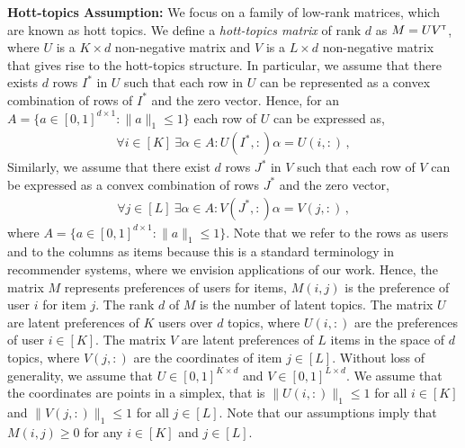 \textbf{Hott-topics Assumption:} We focus on a family of low-rank matrices, which are known as hott topics. We define a \emph{hott-topics matrix} of rank $d$ as $M = U V^\mathsf{\scriptscriptstyle T}$, where $U$ is a $K \times d$ non-negative matrix and $V$ is a $L \times d$ non-negative matrix that gives rise to the hott-topics structure. In particular, we assume that there exists $d$ rows $I^\ast$ in $U$ such that each row in $U$ can be represented as a convex combination of rows of $I^\ast$ and the zero vector. Hence, for an $A = \{a \in [0, 1]^{d \times 1}: \|a\|_1 \leq 1\}$ each row of $U$ can be expressed as,
\begin{align}
  \forall i \in [K] \ \exists \alpha \in A: U(I^\ast, :) \alpha = U(i, :)\,,
  \label{eq:hott topics1}
\end{align}
Similarly, we assume that there exist $d$ rows $J^\ast$ in $V$ such that each row of $V$ can be expressed as a convex combination of rows $J^\ast$ and the zero vector,
\begin{align}
  \forall j \in [L] \ \exists \alpha \in A: V(J^\ast, :) \alpha = V(j, :)\,,
  \label{eq:hott topics}
\end{align}
where $A = \{a \in [0, 1]^{d \times 1}: \|a\|_1 \leq 1\}$. Note that we refer to the rows as users and to the columns as items because this is a standard terminology in recommender systems, where we envision applications of our work. Hence, the matrix $M$ represents preferences of users for items, $M(i, j)$ is the preference of user $i$ for item $j$. The rank $d$ of $M$ is the number of latent topics. The matrix $U$ are latent preferences of $K$ users over $d$ topics, where $U(i, :)$ are the preferences of user $i \in [K]$. The matrix $V$ are latent preferences of $L$ items in the space of $d$ topics, where $V(j, :)$ are the coordinates of item $j \in [L]$. Without loss of generality, we assume that $U \in [0, 1]^{K \times d}$ and $V \in [0, 1]^{L \times d}$. We assume that the coordinates are points in a simplex, that is $\|U(i, :)\|_1 \leq 1$ for all $i \in [K]$ and $\|V(j, :)\|_1 \leq 1$ for all $j \in [L]$. Note that our assumptions imply that $M(i, j) \geq 0$ for any $i \in [K]$ and $j \in [L]$.

